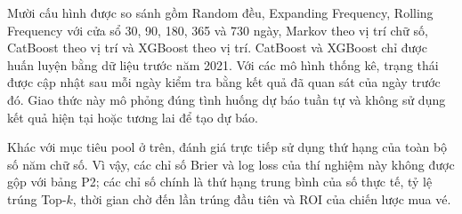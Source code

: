Mười cấu hình được so sánh gồm Random đều, Expanding Frequency, Rolling Frequency với cửa sổ 30, 90, 180, 365 và 730 ngày, Markov theo vị trí chữ số, CatBoost theo vị trí và XGBoost theo vị trí. CatBoost và XGBoost chỉ được huấn luyện bằng dữ liệu trước năm 2021. Với các mô hình thống kê, trạng thái được cập nhật sau mỗi ngày kiểm tra bằng kết quả đã quan sát của ngày trước đó. Giao thức này mô phỏng đúng tình huống dự báo tuần tự và không sử dụng kết quả hiện tại hoặc tương lai để tạo dự báo.

Khác với mục tiêu pool ở trên, đánh giá trực tiếp sử dụng thứ hạng của toàn bộ số năm chữ số. Vì vậy, các chỉ số Brier và log loss của thí nghiệm này không được gộp với bảng P2; các chỉ số chính là thứ hạng trung bình của số thực tế, tỷ lệ trúng Top-$k$, thời gian chờ đến lần trúng đầu tiên và ROI của chiến lược mua vé.